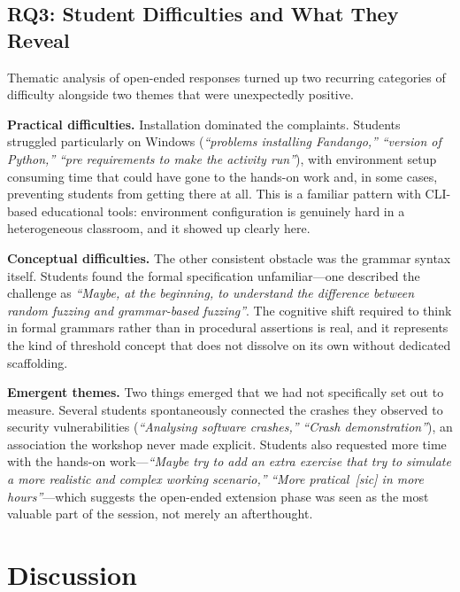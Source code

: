 \documentclass[conference]{IEEEtran}
\begin{document}
\subsection{RQ3: Student Difficulties and What They Reveal}

Thematic analysis of open-ended responses turned up two recurring categories of difficulty alongside two themes that were unexpectedly positive.

\textbf{Practical difficulties.}
Installation dominated the complaints.
Students struggled particularly on Windows (\emph{``problems installing Fandango,''} \emph{``version of Python,''} \emph{``pre requirements to make the activity run''}), with environment setup consuming time that could have gone to the hands-on work and, in some cases, preventing students from getting there at all.
This is a familiar pattern with CLI-based educational tools: environment configuration is genuinely hard in a heterogeneous classroom, and it showed up clearly here.

\textbf{Conceptual difficulties.}
The other consistent obstacle was the grammar syntax itself.
Students found the formal specification unfamiliar---one described the challenge as \emph{``Maybe, at the beginning, to understand the difference between random fuzzing and grammar-based fuzzing''}.
The cognitive shift required to think in formal grammars rather than in procedural assertions is real, and it represents the kind of threshold concept that does not dissolve on its own without dedicated scaffolding.

\textbf{Emergent themes.}
Two things emerged that we had not specifically set out to measure.
Several students spontaneously connected the crashes they observed to security vulnerabilities (\emph{``Analysing software crashes,''} \emph{``Crash demonstration''}), an association the workshop never made explicit.
Students also requested more time with the hands-on work---\emph{``Maybe try to add an extra exercise that try to simulate a more realistic and complex working scenario,''} \emph{``More pratical~[sic] in more hours''}---which suggests the open-ended extension phase was seen as the most valuable part of the session, not merely an afterthought.

\section{Discussion}
\label{sec:discussion}
\end{document}
